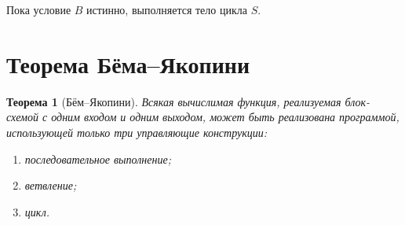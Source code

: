 \documentclass[12pt,a4paper]{article}
\newtheorem{theorem}{Теорема}
\begin{document}
Пока условие $B$ истинно, выполняется тело цикла $S$.

\section{Теорема Бёма--Якопини}

\begin{theorem}[Бём--Якопини]
Всякая вычислимая функция, реализуемая блок-схемой с одним входом и одним выходом, может быть реализована программой, использующей только три управляющие конструкции:
\begin{enumerate}
    \item последовательное выполнение;
    \item ветвление;
    \item цикл.
\end{enumerate}
\end{theorem}
\end{document}
